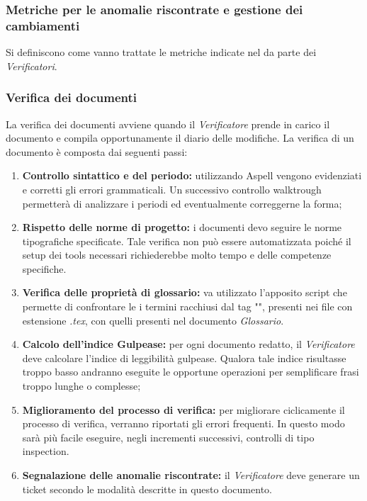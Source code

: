 	\subsubsection{Metriche per le anomalie riscontrate e gestione dei cambiamenti}
	Si definiscono come vanno trattate le metriche indicate nel \PianoDiQualifica  da parte dei \emph{Verificatori}.
	
	
	\subsubsection{Verifica dei documenti}
	La verifica dei documenti avviene quando il \emph{Verificatore} prende in carico il documento e compila opportunamente il diario delle modifiche. La verifica di un documento è composta dai seguenti passi:
	\begin{enumerate}
		\item \textbf{Controllo sintattico e del periodo:} utilizzando Aspell vengono evidenziati e corretti gli errori grammaticali. Un successivo controllo walktrough permetterà di analizzare i periodi ed eventualmente correggerne la forma;
		\item \textbf{Rispetto delle norme di progetto:} i documenti devo seguire le norme tipografiche specificate. Tale verifica non può essere automatizzata poiché il setup dei tools necessari richiederebbe molto tempo e delle competenze specifiche. 
		\item \textbf{Verifica delle proprietà di glossario:} va utilizzato l'apposito script che permette di confrontare le i termini racchiusi dal tag "\glossario{}", presenti nei file con estensione \emph{.tex}, con quelli presenti nel documento \emph{Glossario}.
		\item \textbf{Calcolo dell'indice Gulpease:} per ogni documento redatto, il \emph{Verificatore} deve calcolare l'indice di leggibilità gulpease. Qualora tale indice risultasse troppo basso andranno eseguite le opportune operazioni per semplificare frasi troppo lunghe o complesse;
		\item \textbf{Miglioramento del processo di verifica:} per migliorare ciclicamente il processo di verifica, verranno riportati gli errori frequenti. In questo modo sarà più facile eseguire, negli incrementi successivi, controlli di tipo inspection.
		\item \textbf{Segnalazione delle anomalie riscontrate:} il \emph{Verificatore} deve generare un ticket secondo le modalità descritte in questo documento.
	\end{enumerate}
	
